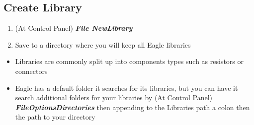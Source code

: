 \documentclass{article}
\begin{document}
\subsection{Create Library} \label{create library}
\begin{enumerate}
    \item (At Control Panel) \textit{\textbf{File\textrightarrow
    New\textrightarrow Library}}
    \item Save to a directory where you will keep all Eagle libraries
\end{enumerate}
\begin{tcolorbox} [title=Tips \& Tricks]
    \begin{itemize}
        \item Libraries are commonly split up into components types such as resistors or connectors
        \item Eagle has a default folder it searches for its libraries, but you can have it search additional folders for your libraries by (At Control Panel) \textit{\textbf{File\textrightarrow Options\textrightarrow Directories}} then appending to the Libraries path a colon then the path to your directory
    \end{itemize}
\end{tcolorbox}
\end{document}
